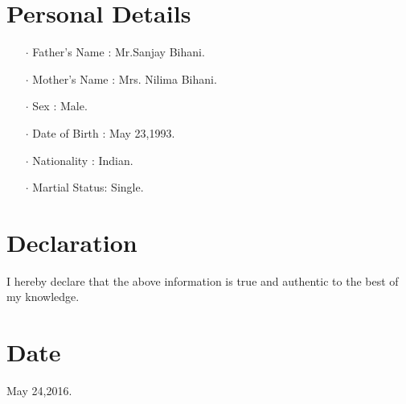 \documentclass[12pt]{article}
\begin{document}
\section*{Personal Details}
\begin{itemize}
\item[$\cdot$]Father's Name : Mr.Sanjay Bihani.
\item[$\cdot$]Mother's Name : Mrs. Nilima Bihani.
\item[$\cdot$]Sex           : Male.
\item[$\cdot$]Date of Birth : May 23,1993.
\item[$\cdot$]Nationality   : Indian.
\item[$\cdot$]Martial Status: Single.
\end{itemize}
\section*{Declaration} I hereby declare that the above information is true and authentic to the best of my knowledge.
\section*{Date} May 24,2016.
\end{document}
